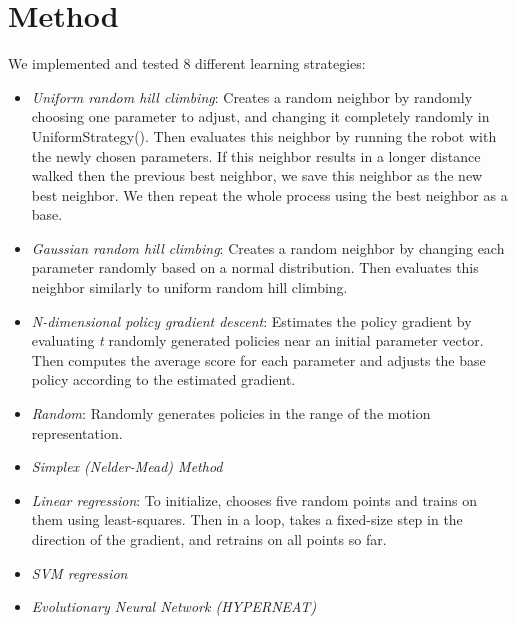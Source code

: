 \section{Method}
We implemented and tested 8 different learning strategies:
\begin{itemize}
\item \emph{Uniform random hill climbing}: Creates a random neighbor by
  randomly choosing one parameter to adjust, and changing it completely 
  randomly in UniformStrategy(). Then evaluates this neighbor by running 
  the robot with the newly chosen parameters. If this neighbor results in a
  longer distance walked then the previous best neighbor, we save this
  neighbor as the new best neighbor. We then repeat the whole process
  using the best neighbor as a base.
\item \emph{Gaussian random hill climbing}: Creates a random neighbor by
  changing each parameter randomly based on a normal distribution. Then
  evaluates this neighbor similarly to uniform random hill climbing.
\item \emph{N-dimensional policy gradient descent}: Estimates the policy
  gradient by evaluating \emph{t} randomly generated policies
  near an initial parameter vector. Then computes the average score for
  each parameter and adjusts the base policy according to the estimated
  gradient.
\item \emph{Random}: Randomly generates policies in the range of the motion
representation.
\item \emph{Simplex (Nelder-Mead) Method}
\item \emph{Linear regression}: To initialize, chooses five random points
and trains on them using least-squares. Then in a loop, takes a fixed-size
step in the direction of the gradient, and retrains on all points so far.
\item \emph{SVM regression}
\item \emph{Evolutionary Neural Network (HYPERNEAT)\cite{2}}
\end{itemize}

